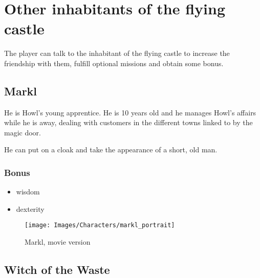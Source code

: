 \section{Other inhabitants of the flying castle}

The player can talk to the inhabitant of the flying castle to increase the friendship with them, fulfill optional missions and obtain some bonus.

\subsection{Markl}

\begin{minipage}[t]{0.5\textwidth}
He is Howl’s young apprentice. He is 10 years old and he manages Howl's affairs while he is away, dealing with customers in the different towns linked to by the magic door.

He can put on a cloak and take the appearance of a short, old man.

\subsubsection{Bonus}
\begin{itemize}
	\item wisdom
	\item dexterity
\end{itemize}

\end{minipage}%
%
\hfill
\begin{minipage}[t]{0.4\textwidth}
  \begin{figure}[H]
    \hfill\texttt{[image: Images/Characters/markl\_portrait]}
    \caption{Markl, movie version}
  \end{figure}
\end{minipage}

\subsection{Witch of the Waste}


